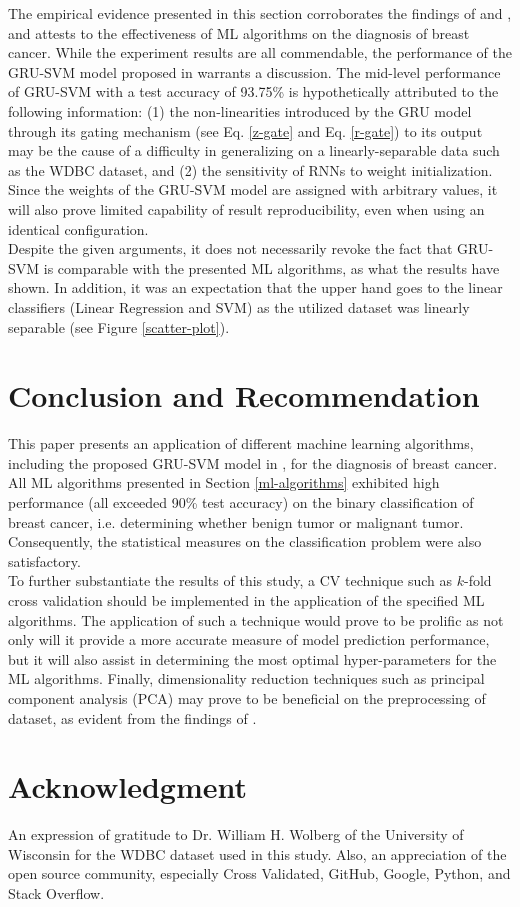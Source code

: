 \indent	The empirical evidence presented in this section corroborates the findings of \cite{salama2012breast} and \cite{zafiropoulos2006support}, and attests to the effectiveness of ML algorithms on the diagnosis of breast cancer. While the experiment results are all commendable, the performance of the GRU-SVM model proposed in \cite{agarap2017neural} warrants a discussion. The mid-level performance of GRU-SVM with a test accuracy of 93.75\% is hypothetically attributed to the following information: (1) the non-linearities introduced by the GRU model\cite{Cho} through its gating mechanism (see Eq. \ref{z-gate} and Eq. \ref{r-gate}) to its output may be the cause of a difficulty in generalizing on a linearly-separable data such as the WDBC dataset, and (2) the sensitivity of RNNs to weight initialization\cite{alalshekmubarak2013novel}. Since the weights of the GRU-SVM model are assigned with arbitrary values, it will also prove limited capability of result reproducibility, even when using an identical configuration\cite{alalshekmubarak2013novel}.\\
\indent	Despite the given arguments, it does not necessarily revoke the fact that GRU-SVM is comparable with the presented ML algorithms, as what the results have shown. In addition, it was an expectation that the upper hand goes to the linear classifiers (Linear Regression and SVM) as the utilized dataset was linearly separable (see Figure \ref{scatter-plot}).

\section{Conclusion and Recommendation}

This paper presents an application of different machine learning algorithms, including the proposed GRU-SVM model in \cite{agarap2017neural}, for the diagnosis of breast cancer. All ML algorithms presented in Section \ref{ml-algorithms} exhibited high performance (all exceeded 90\% test accuracy) on the binary classification of breast cancer, i.e. determining whether benign tumor or malignant tumor. Consequently, the statistical measures on the classification problem were also satisfactory.\\
\indent	To further substantiate the results of this study, a CV technique such as $k$-fold cross validation should be implemented in the application of the specified ML algorithms. The application of such a technique would prove to be prolific as not only will it provide a more accurate measure of model prediction performance, but it will also assist in determining the most optimal hyper-parameters for the ML algorithms\cite{bengio2015deep}. Finally, dimensionality reduction techniques such as principal component analysis (PCA) may prove to be beneficial on the preprocessing of dataset, as evident from the findings of \cite{salama2012breast}.

\section{Acknowledgment}

An expression of gratitude to Dr. William H. Wolberg of the University of Wisconsin for the WDBC dataset used in this study. Also, an appreciation of the open source community, especially Cross Validated, GitHub, Google, Python, and Stack Overflow.